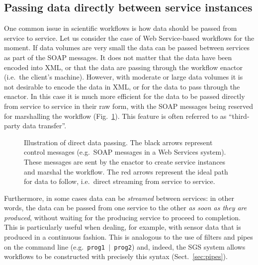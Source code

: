 \documentclass{llncs}
\begin{document}
\subsection{Passing data directly between service instances}\label{sec:datastreaming}
One common issue in scientific workflows is how data should be passed from service to service.  Let us consider the case of Web Service-based workflows for the moment.  If data volumes are very small the data can be passed between services as part of the SOAP messages.  It does not matter that the data have been encoded into XML, or that the data are passing through the workflow enactor (i.e.\ the client's machine).  However, with moderate or large data volumes it is not desirable to encode the data in XML, or for the data to pass through the enactor.  In this case it is much more efficient for the data to be passed directly from service to service in their raw form, with the SOAP messages being reserved for marshalling the workflow (Fig.~\ref{fig:datastreaming}).  This feature is often referred to as ``third-party data transfer''.

\begin{figure}
\caption{Illustration of direct data passing.  The black arrows represent control messages (e.g.\ SOAP messages in a Web Services system).  These messages are sent by the enactor to create service instances and marshal the workflow.  The red arrows represent the ideal path for data to follow, i.e.\ direct streaming from service to service.}\label{fig:datastreaming}
\end{figure}

Furthermore, in some cases data can be {\em streamed\/} between services: in other words, the data can be passed from one service to the other {\em as soon as they are produced\/}, without waiting for the producing service to proceed to completion.  This is particularly useful when dealing, for example, with sensor data that is produced in a continuous fashion.  This is analogous to the use of filters and pipes on the command line (e.g.\ {\tt prog1 $|$ prog2}) and, indeed, the SGS system allows workflows to be constructed with precisely this syntax (Sect.~\ref{sec:pipes}).
\end{document}

